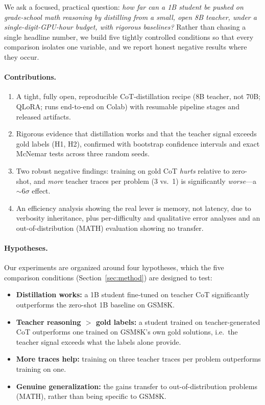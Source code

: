 \documentclass[11pt]{article}
\begin{document}
We ask a focused, practical question: \emph{how far can a 1B student be pushed on
grade-school math reasoning by distilling from a small, open 8B teacher, under a
single-digit-GPU-hour budget, with rigorous baselines?} Rather than chasing a
single headline number, we build five tightly controlled conditions so that every
comparison isolates one variable, and we report honest negative results where they
occur.

\paragraph{Contributions.}
\begin{enumerate}
  \item A tight, fully open, reproducible CoT-distillation recipe (8B teacher, not
  70B; QLoRA; runs end-to-end on Colab) with resumable pipeline stages and
  released artifacts.
  \item Rigorous evidence that distillation works and that the teacher signal
  exceeds gold labels (H1, H2), confirmed with bootstrap confidence intervals and
  exact McNemar tests across three random seeds.
  \item Two robust negative findings: training on gold CoT \emph{hurts} relative to
  zero-shot, and \emph{more} teacher traces per problem (3 vs.\ 1) is significantly
  \emph{worse}---a $\sim$6$\sigma$ effect.
  \item An efficiency analysis showing the real lever is memory, not latency, due
  to verbosity inheritance, plus per-difficulty and qualitative error analyses and
  an out-of-distribution (MATH) evaluation showing no transfer.
\end{enumerate}

\paragraph{Hypotheses.} Our experiments are organized around four hypotheses, which
the five comparison conditions (Section~\ref{sec:method}) are designed to test:
\begin{itemize}
  \item[\textbf{H1}] \textbf{Distillation works:} a 1B student fine-tuned on
  teacher CoT significantly outperforms the zero-shot 1B baseline on GSM8K.
  \item[\textbf{H2}] \textbf{Teacher reasoning $>$ gold labels:} a student trained
  on teacher-generated CoT outperforms one trained on GSM8K's own gold solutions,
  i.e.\ the teacher signal exceeds what the labels alone provide.
  \item[\textbf{H3}] \textbf{More traces help:} training on three teacher traces
  per problem outperforms training on one.
  \item[\textbf{H4}] \textbf{Genuine generalization:} the gains transfer to
  out-of-distribution problems (MATH), rather than being specific to GSM8K.
\end{itemize}
\end{document}
